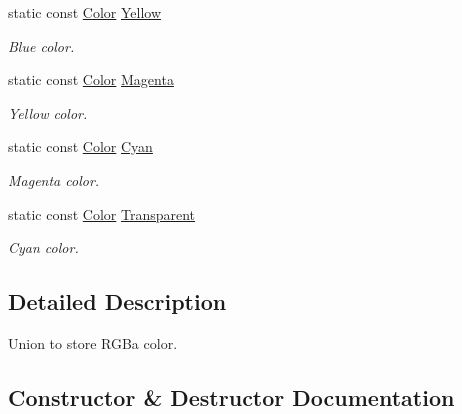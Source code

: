 \begin{DoxyCompactItemize}
static const \hyperlink{unionarcade_1_1Color}{Color} \hyperlink{unionarcade_1_1Color_aa437de4029652dba87b0b64ca488f8ff}{Yellow}
\begin{DoxyCompactList}\small\item\em Blue color. \end{DoxyCompactList}\item 
\mbox{\label{unionarcade_1_1Color_aabfdd84cadc61ca458e8122869310631}} 
static const \hyperlink{unionarcade_1_1Color}{Color} \hyperlink{unionarcade_1_1Color_aabfdd84cadc61ca458e8122869310631}{Magenta}
\begin{DoxyCompactList}\small\item\em Yellow color. \end{DoxyCompactList}\item 
\mbox{\label{unionarcade_1_1Color_a73cbdbe2ebf731489bafec16cb88e705}} 
static const \hyperlink{unionarcade_1_1Color}{Color} \hyperlink{unionarcade_1_1Color_a73cbdbe2ebf731489bafec16cb88e705}{Cyan}
\begin{DoxyCompactList}\small\item\em Magenta color. \end{DoxyCompactList}\item 
\mbox{\label{unionarcade_1_1Color_a689350442a28301beb49ca78a4885e4f}} 
static const \hyperlink{unionarcade_1_1Color}{Color} \hyperlink{unionarcade_1_1Color_a689350442a28301beb49ca78a4885e4f}{Transparent}
\begin{DoxyCompactList}\small\item\em Cyan color. \end{DoxyCompactList}\end{DoxyCompactItemize}


\subsection{Detailed Description}
Union to store R\+G\+Ba color. 

\subsection{Constructor \& Destructor Documentation}
\mbox{\label{unionarcade_1_1Color_a053784aa4df3917111e2717d74fa3d85}} 
